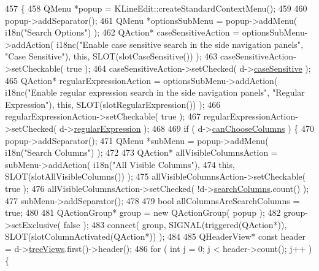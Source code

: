 \begin{DoxyCode}
457 \{
458   QMenu *popup = KLineEdit::createStandardContextMenu();
459 
460   popup->addSeparator();
461   QMenu *optionsSubMenu = popup->addMenu( i18n(\textcolor{stringliteral}{"Search Options"}) );
462   QAction* caseSensitiveAction = optionsSubMenu->addAction( i18nc(\textcolor{stringliteral}{"Enable case sensitive search in the side
       navigation panels"}, \textcolor{stringliteral}{"Case Sensitive"}), \textcolor{keyword}{this}, SLOT(slotCaseSensitive()) );
463   caseSensitiveAction->setCheckable( \textcolor{keyword}{true} );
464   caseSensitiveAction->setChecked( d->\hyperlink{classKTreeViewSearchLine_1_1Private_ac529094933f7a304381f4f51831138d7}{caseSensitive} );
465   QAction* regularExpressionAction = optionsSubMenu->addAction( i18nc(\textcolor{stringliteral}{"Enable regular expression search in
       the side navigation panels"}, \textcolor{stringliteral}{"Regular Expression"}), \textcolor{keyword}{this}, SLOT(slotRegularExpression()) );
466   regularExpressionAction->setCheckable( \textcolor{keyword}{true} );
467   regularExpressionAction->setChecked( d->\hyperlink{classKTreeViewSearchLine_1_1Private_ab02ea0ecfae43ab59884906e98e1468e}{regularExpression} );
468 
469   \textcolor{keywordflow}{if} ( d->\hyperlink{classKTreeViewSearchLine_1_1Private_a4b7cae206d347905d89dff317c22a87c}{canChooseColumns} ) \{
470     popup->addSeparator();
471     QMenu *subMenu = popup->addMenu( i18n(\textcolor{stringliteral}{"Search Columns"}) );
472 
473     QAction* allVisibleColumnsAction = subMenu->addAction( i18n(\textcolor{stringliteral}{"All Visible Columns"}),
474                                                            \textcolor{keyword}{this}, SLOT(slotAllVisibleColumns()) );
475     allVisibleColumnsAction->setCheckable( \textcolor{keyword}{true} );
476     allVisibleColumnsAction->setChecked( !d->\hyperlink{classKTreeViewSearchLine_1_1Private_a2e8b3ddf8c1f4a5812f863eda57188d6}{searchColumns}.count() );
477     subMenu->addSeparator();
478 
479     \textcolor{keywordtype}{bool} allColumnsAreSearchColumns = \textcolor{keyword}{true};
480 
481     QActionGroup* group = \textcolor{keyword}{new} QActionGroup( popup );
482     group->setExclusive( \textcolor{keyword}{false} );
483     connect( group, SIGNAL(triggered(QAction*)), SLOT(slotColumnActivated(QAction*)) );
484 
485     QHeaderView* \textcolor{keyword}{const} header = d->\hyperlink{classKTreeViewSearchLine_1_1Private_a1cc9fa46d2d3b371f075b8beea071555}{treeViews}.first()->header();
486     \textcolor{keywordflow}{for} ( \textcolor{keywordtype}{int} j = 0; j < header->count(); j++ ) \{

\end{DoxyCode}

